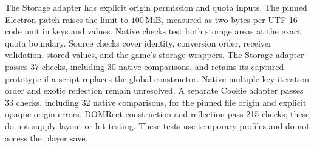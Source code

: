 \documentclass[11pt,a4paper]{article}
\numberwithin{equation}{section}
\theoremstyle{definition}
\theoremstyle{remark}
\begin{document}
The Storage adapter has explicit origin permission and quota inputs. The pinned Electron patch raises the limit to $100$\,MiB, measured as two bytes per UTF-16 code unit in keys and values. Native checks test both storage areas at the exact quota boundary. Source checks cover identity, conversion order, receiver validation, stored values, and the game's storage wrappers. The Storage adapter passes 37 checks, including 30 native comparisons, and retains its captured prototype if a script replaces the global constructor. Native multiple-key iteration order and exotic reflection remain unresolved. A separate Cookie adapter passes 33 checks, including 32 native comparisons, for the pinned file origin and explicit opaque-origin errors. DOMRect construction and reflection pass 215 checks; these do not supply layout or hit testing. These tests use temporary profiles and do not access the player save.
\end{document}
